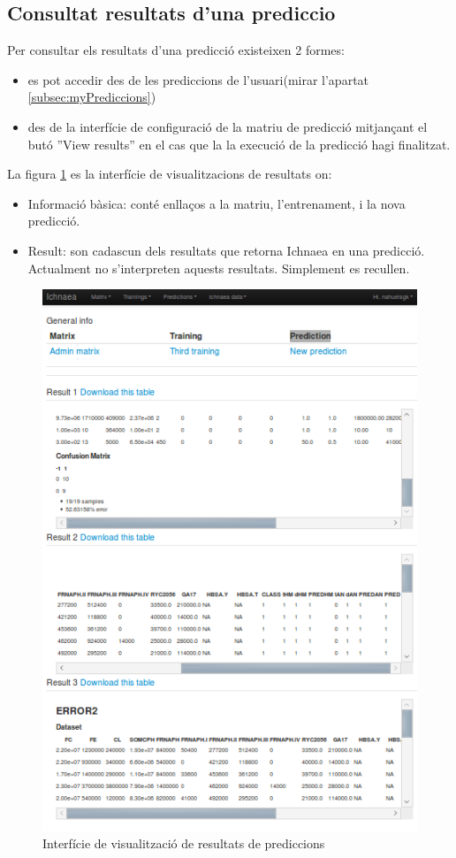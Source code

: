 \subsection{Consultat resultats d'una prediccio}
Per consultar els resultats d'una predicció existeixen 2 formes:
\begin{itemize}
\item es pot accedir des de les prediccions de l'usuari(mirar l'apartat \ref{subsec:myPrediccions}) 
\item des de la interfície de configuració de la matriu de predicció mitjançant el but\'{o} ''View results'' en el cas que la la execució de la predicció hagi finalitzat.
\end{itemize}
La figura \ref{fig:viewresults} es la interfície de visualitzacions de resultats on:
\begin{itemize}
\item Informació bàsica: cont\'{e} enllaços a la matriu, l'entrenament, i la nova predicció.
\item Result: son cadascun dels resultats que retorna Ichnaea en una predicció. Actualment no s'interpreten aquests resultats. Simplement es recullen.
\end{itemize}
\begin{figure}[h!]
  \centering
  \includegraphics[scale=0.5]{img/userguide/result_prediction_gui.png}
  \caption{Interfície de visualització de resultats de prediccions}
  \label{fig:viewresults}
\end{figure}

